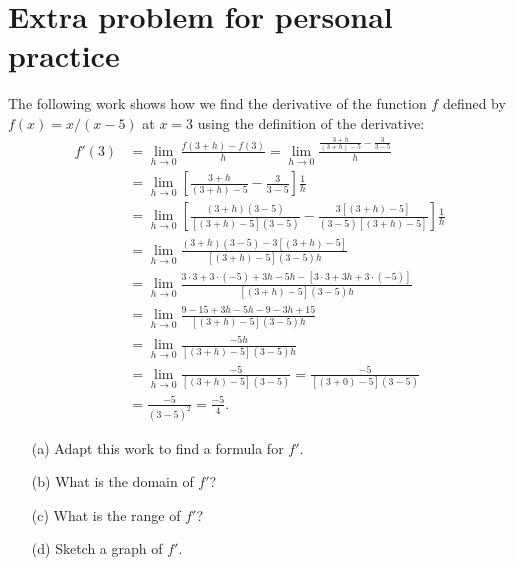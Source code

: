 \documentclass[handout,nooutcomes]{ximera}
\begin{document}
\section{Extra problem for personal practice}
\begin{problem}
  The following work shows how we find the derivative of the function $f$ defined by $f(x) = x/(x-5)$ at $x = 3$ using the definition of the derivative:
  \begin{align*}
    f'(3) &= \lim_{h \to 0} \frac{f(3 + h) - f(3)}{h} = \lim_{h \to 0} \frac{\frac{3+h}{(3+h) - 5} - \frac{3}{3-5}}{h}\\
    &= \lim_{h \to 0} \left[\frac{3+h}{(3+h) - 5} - \frac{3}{3-5}\right]\frac{1}{h} \\
    &= \lim_{h \to 0} \left[\frac{(3+h)(3-5)}{[(3+h) - 5](3-5)} - \frac{3[(3+h)-5]}{(3-5)[(3+h)-5]}\right]\frac{1}{h} \\
    &= \lim_{h \to 0} \frac{(3+h)(3-5) - 3[(3+h)-5]}{[(3+h) - 5](3-5)h}\\
    &= \lim_{h \to 0} \frac{3 \cdot 3 + 3\cdot (-5) + 3h - 5h -[3\cdot3 + 3h + 3\cdot(-5)]}{[(3+h) - 5](3-5)h}\\
    &= \lim_{h \to 0} \frac{9 -15 + 3h - 5h -9 - 3h + 15}{[(3+h) - 5](3-5)h}\\
    &= \lim_{h \to 0} \frac{-5h}{[(3+h) - 5](3-5)h} \\
    &= \lim_{h \to 0} \frac{-5}{[(3+h) - 5](3-5)} = \frac{-5}{[(3+0) - 5](3-5)}\\
    &= \frac{-5}{(3-5)^2} = \frac{-5}{4}.
  \end{align*}
  \begin{itemize}
    \item[(a)]
      Adapt this work to find a formula for $f'$.

    \item[(b)]
      What is the domain of $f'$?

    \item[(c)]
      What is the range of $f'$?

    \item[(d)]
      Sketch a graph of $f'$.
  \end{itemize}
\end{problem}
\end{document}
